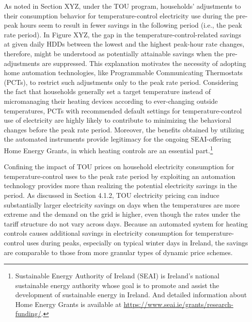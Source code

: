 As noted in Section XYZ, under the TOU program, households' adjustments to their consumption behavior for temperature-control electricity use during the pre-peak hours seem to result in fewer savings in the following period (i.e., the peak rate period). In Figure XYZ, the gap in the temperature-control-related savings at given daily HDDs between the lowest and the highest peak-hour rate changes, therefore, might be understood as potentially attainable savings when the pre-adjustments are suppressed. This explanation motivates the necessity of adopting home automation technologies, like Programmable Communicating Thermostats (PCTs), to restrict such adjustments only to the peak rate period. Considering the fact that households generally set a target temperature instead of micromanaging their heating devices according to ever-changing outside temperatures, PCTs with recommended default settings for temperature-control use of electricity are highly likely to contribute to minimizing the behavioral changes before the peak rate period. Moreover, the benefits obtained by utilizing the automated instruments provide legitimacy for the ongoing SEAI-offering Home Energy Grants, in which heating controls are an essential part.\footnote{Sustainable Energy Authority of Ireland (SEAI) is Ireland's national sustainable energy authority whose goal is to promote and assist the development of sustainable energy in Ireland. And detailed information about Home Energy Grants is available at \url{https://www.seai.ie/grants/research-funding/}.} 

Confining the impact of TOU prices on household electricity consumption for temperature-control uses to the peak rate period by exploiting an automation technology provides more than realizing the potential electricity savings in the period. As discussed in Section 4.1.2, TOU electricity pricing can induce substantially larger electricity savings on days when the temperatures are more extreme and the demand on the grid is higher, even though the rates under the tariff structure do not vary across days. Because an automated system for heating controls causes additional savings in electricity consumption for temperature-control uses during peaks, especially on typical winter days in Ireland, the savings are comparable to those from more granular types of dynamic price schemes. 

